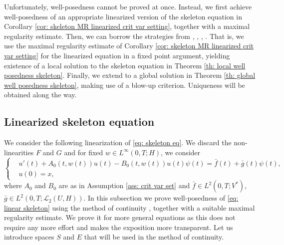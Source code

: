 \documentclass{amsart}
\newcommand{\UH}{\mathcal{L}_2(U,H)}
\newcommand{\<}{\langle}
\newcommand{\?}{\rangle}
\theoremstyle{plain}
\theoremstyle{remark}
\theoremstyle{plain}
\numberwithin{equation}{section}
\begin{document}
Unfortunately, well-posedness cannot be proved at once.
Instead, we first achieve well-posedness of an appropriate linearized version of the skeleton equation in Corollary \ref{cor: skeleton MR linearized crit var setting}, together with a maximal regularity estimate.
Then, we can borrow the strategies from \cite[Chap. 18]{HNVWvolume3}, \cite{pruss17addendum}, \cite{pruss18JDE}, \cite{pruss16}.
That is, we use the maximal regularity estimate of Corollary \ref{cor: skeleton MR linearized crit var setting} for the linearized equation in a fixed point argument, yielding existence of a local solution to the skeleton equation in Theorem \ref{th: local well posedness skeleton}. Finally, we extend to a global solution in Theorem \ref{th: global well posedness skeleton}, making use of a blow-up criterion. Uniqueness will be obtained along the way.




\subsection{Linearized skeleton equation}

We consider the following linearization of \eqref{eq: skeleton eq}. We discard the non-linearities $F$ and $G$ and for fixed $w\in L^\infty(0,T;H)$, we consider
\begin{equation}\label{eq: linear skeleton}
\begin{cases}
    &u'(t)+A_0(t,w(t))u(t)-B_0(t,w(t))u(t)\psi(t)=\bar{f}(t)+\bar{g}(t)\psi(t), \\
    &u(0)=x,
\end{cases}
\end{equation}
where $A_0$ and $B_0$ are as in Assumption \ref{ass: crit var set} and $\bar{f}\in L^2(0,T;V^*)$, $\bar{g}\in L^2(0,T;\UH)$.
In this subsection we prove well-posedness of \eqref{eq: linear skeleton} using the method of continuity \cite[Lem. 16.2.2]{HNVWvolume3}, together with a suitable maximal regularity estimate. We prove it for more general equations as this does not require any more effort and makes the exposition more transparent. Let us introduce spaces $S$ and $E$ that will be used in the method of continuity.
\end{document}
